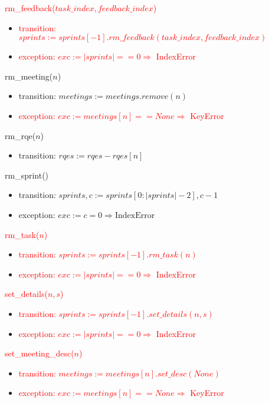 \documentclass[12pt, titlepage]{article}
\begin{document}
\noindent \textcolor{red}{rm\_feedback($task\_index, feedback\_index$)}
\begin{itemize}
    \item \textcolor{red}{transition: $sprints := sprints[-1].rm\_feedback(task\_index,feedback\_index)$}
    \item \textcolor{red}{exception: $exc := |sprints| == 0 \Rightarrow$ IndexError}
\end{itemize}

\noindent rm\_meeting($n$)
\begin{itemize}
    \item transition: $meetings := meetings.remove(n)$
    \item \textcolor{red}{exception: $exc := meetings[n] == None \Rightarrow$ KeyError}
\end{itemize}

\noindent rm\_rqe($n$)
\begin{itemize}
    \item transition: $rqes := rqes - rqes[n]$
\end{itemize}

\noindent rm\_sprint()
\begin{itemize}
    \item transition: $sprints, c := sprints[0: |sprints| - 2], c - 1$
    \item exception: $exc := c = 0 \Rightarrow \text{IndexError}$
\end{itemize}

\noindent \textcolor{red}{rm\_task($n$)}
\begin{itemize}
    \item \textcolor{red}{transition: $sprints := sprints[-1].rm\_task(n)$}
    \item \textcolor{red}{exception: $exc := |sprints| == 0 \Rightarrow$ IndexError}
\end{itemize}

\noindent \textcolor{red}{set\_details($n,s$)}
\begin{itemize}
    \item \textcolor{red}{transition: $sprints := sprints[-1].set\_details(n,s)$}
    \item \textcolor{red}{exception: $exc := |sprints| == 0 \Rightarrow$ IndexError}
\end{itemize}

\noindent \textcolor{red}{set\_meeting\_desc($n$)}
\begin{itemize}
    \item \textcolor{red}{transition: $meetings := meetings[n].set\_desc(None)$}
    \item \textcolor{red}{exception: $exc := meetings[n] == None \Rightarrow$ KeyError}
\end{itemize}
\end{document}
